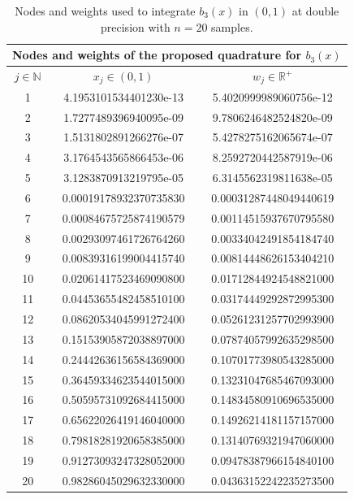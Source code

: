 \documentclass[a4paper, twosided]{book}
\begin{document}
\begin{table}[H]
\centering
\begin{tabular}{|c||c|c|}
\hline
\multicolumn{3}{|c|}{\textbf{Nodes and weights of the proposed quadrature for $b_3(x)$}} \\
\hline
$j\in\mathbb{N}$ & $x_j\in(0,1)$ & $w_j\in\mathbb{R}^+$ \\
\hline
1   &  4.1953101534401230e-13   &  5.4020999989060756e-12  \\
2   &  1.7277489396940095e-09   &  9.7806246482524820e-09  \\
3   &  1.5131802891266276e-07   &  5.4278275162065674e-07  \\
4   &  3.1764543565866453e-06   &  8.2592720442587919e-06  \\
5   &  3.1283870913219795e-05   &  6.3145562319811638e-05  \\
6   &  0.00019178932370735830   &  0.00031287448049440619  \\
7   &  0.00084675725874190579   &  0.00114515937670795580  \\
8   &  0.00293097461726764260   &  0.00334042491854184740  \\
9   &  0.00839316199004415740   &  0.00814448626153404210  \\
10  &  0.02061417523469090800   &  0.01712844924548821000  \\
11  &  0.04453655482458510100   &  0.03174449292872995300  \\
12  &  0.08620534045991272400   &  0.05261231257702993900  \\
13  &  0.15153905872038897000   &  0.07874057992635298500  \\
14  &  0.24442636156584369000   &  0.10701773980543285000  \\
15  &  0.36459334623544015000   &  0.13231047685467093000  \\
16  &  0.50595731092684415000   &  0.14834580910696535000  \\
17  &  0.65622026419146040000   &  0.14926214181157157000  \\
18  &  0.79818281920658385000   &  0.13140769321947060000  \\
19  &  0.91273093247328052000   &  0.09478387966154840100  \\
20  &  0.98286045029632330000   &  0.04363152242235273500  \\
\hline
\end{tabular}
  \caption{Nodes and weights used to integrate $b_3(x)$ in $(0,1)$ at double precision with $n=20$ samples.}
  \label{table2.7}
\end{table}
\end{document}
